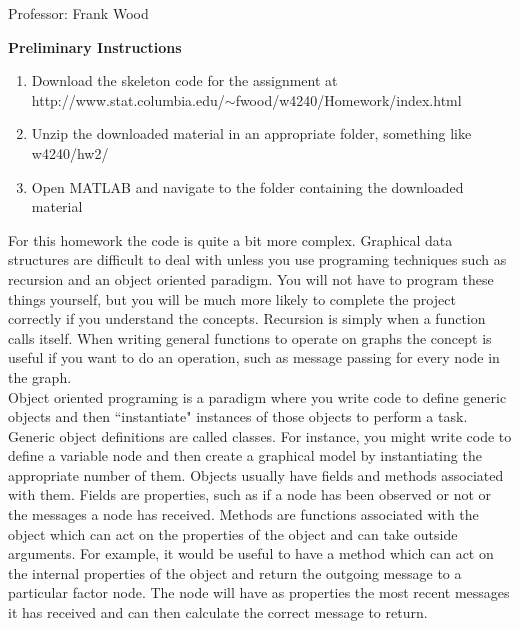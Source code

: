 \documentclass[12pt]{article}
\begin{document}

\begin{center}
	Professor: Frank Wood
\end{center}


{\bf Preliminary Instructions}

\begin{enumerate}
	\item Download the skeleton code for the assignment at \\  http://www.stat.columbia.edu/$\sim$fwood/w4240/Homework/index.html
	\item Unzip the downloaded material in an appropriate folder, something like w4240/hw2/
	\item Open MATLAB and navigate to the folder containing the downloaded material
\end{enumerate}

For this homework the code is quite a bit more complex.  Graphical data structures are difficult to deal with unless you use programing techniques such as recursion and an object oriented paradigm. You will not have to program these things yourself, but you will be much more likely to complete the project correctly if you understand the concepts.  Recursion is simply when a function calls itself.  When writing general functions to operate on graphs the concept is useful if you want to do an operation, such as message passing for every node in the graph. \\

Object oriented programing is a paradigm where you write code to define generic objects and then ``instantiate" instances of those objects to perform a task.  Generic object definitions are called classes.  For instance, you might write code to define a variable node and then create a graphical model by instantiating the appropriate number of them.  Objects usually have fields and methods associated with them.  Fields are properties, such as if a node has been observed or not or the messages a node has received.  Methods are functions associated with the object which can act on the properties of the object and can take outside arguments.  For example, it would be useful to have a method which can act on the internal properties of the object and return the outgoing message to a particular factor node. The node will have as properties the most recent messages it has received and can then calculate the correct message to return. \\
\end{document}
